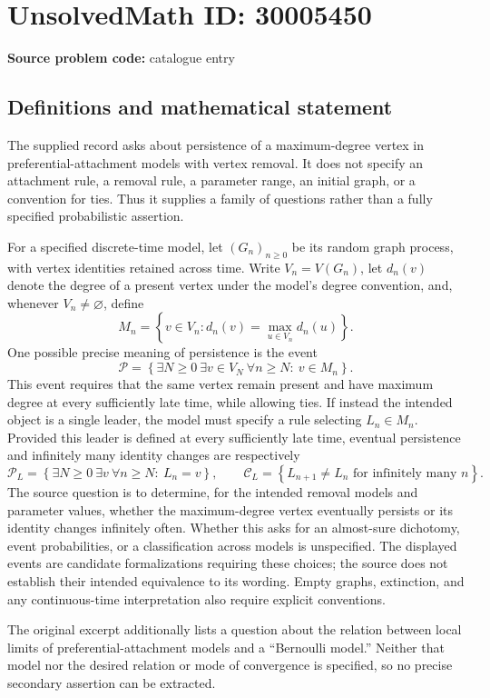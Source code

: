 \documentclass[11pt]{article}
\begin{document}
\section*{UnsolvedMath ID: 30005450}
\textbf{Source problem code:} catalogue entry
\subsection{Definitions and mathematical statement}
The supplied record asks about persistence of a maximum-degree vertex in preferential-attachment models with vertex removal. It does not specify an attachment rule, a removal rule, a parameter range, an initial graph, or a convention for ties. Thus it supplies a family of questions rather than a fully specified probabilistic assertion.

For a specified discrete-time model, let \((G_n)_{n\geq 0}\) be its random graph process, with vertex identities retained across time. Write \(V_n=V(G_n)\), let \(d_n(v)\) denote the degree of a present vertex under the model's degree convention, and, whenever \(V_n\neq\varnothing\), define
\[
M_n=\left\{v\in V_n:d_n(v)=\max_{u\in V_n}d_n(u)\right\}.
\]
One possible precise meaning of persistence is the event
\[
\mathcal P=\left\{\exists N\geq0\ \exists v\in V_N\ \forall n\geq N:\ v\in M_n\right\}.
\]
This event requires that the same vertex remain present and have maximum degree at every sufficiently late time, while allowing ties. If instead the intended object is a single leader, the model must specify a rule selecting \(L_n\in M_n\). Provided this leader is defined at every sufficiently late time, eventual persistence and infinitely many identity changes are respectively
\[
\mathcal P_L=\left\{\exists N\geq0\ \exists v\ \forall n\geq N:\ L_n=v\right\},
\qquad
\mathcal C_L=\left\{L_{n+1}\neq L_n\text{ for infinitely many }n\right\}.
\]
The source question is to determine, for the intended removal models and parameter values, whether the maximum-degree vertex eventually persists or its identity changes infinitely often. Whether this asks for an almost-sure dichotomy, event probabilities, or a classification across models is unspecified. The displayed events are candidate formalizations requiring these choices; the source does not establish their intended equivalence to its wording. Empty graphs, extinction, and any continuous-time interpretation also require explicit conventions.

The original excerpt additionally lists a question about the relation between local limits of preferential-attachment models and a ``Bernoulli model.'' Neither that model nor the desired relation or mode of convergence is specified, so no precise secondary assertion can be extracted.
\end{document}

